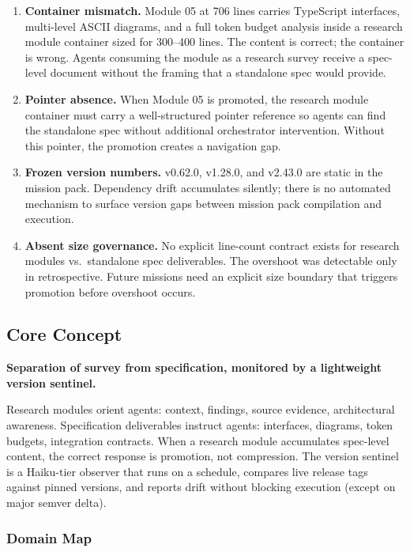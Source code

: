 \documentclass[11pt,letterpaper]{article}
\begin{document}
\begin{enumerate}
  \item \textbf{Container mismatch.} Module 05 at 706 lines carries TypeScript interfaces, multi-level ASCII diagrams, and a full token budget analysis inside a research module container sized for 300--400 lines. The content is correct; the container is wrong. Agents consuming the module as a research survey receive a spec-level document without the framing that a standalone spec would provide.

  \item \textbf{Pointer absence.} When Module 05 is promoted, the research module container must carry a well-structured pointer reference so agents can find the standalone spec without additional orchestrator intervention. Without this pointer, the promotion creates a navigation gap.

  \item \textbf{Frozen version numbers.} v0.62.0, v1.28.0, and v2.43.0 are static in the mission pack. Dependency drift accumulates silently; there is no automated mechanism to surface version gaps between mission pack compilation and execution.

  \item \textbf{Absent size governance.} No explicit line-count contract exists for research modules vs.\ standalone spec deliverables. The overshoot was detectable only in retrospective. Future missions need an explicit size boundary that triggers promotion before overshoot occurs.
\end{enumerate}

\subsection{Core Concept}

\textbf{Separation of survey from specification, monitored by a lightweight version sentinel.}

Research modules orient agents: context, findings, source evidence, architectural awareness. Specification deliverables instruct agents: interfaces, diagrams, token budgets, integration contracts. When a research module accumulates spec-level content, the correct response is promotion, not compression. The version sentinel is a Haiku-tier observer that runs on a schedule, compares live release tags against pinned versions, and reports drift without blocking execution (except on major semver delta).

\subsubsection{Domain Map}
\end{document}
